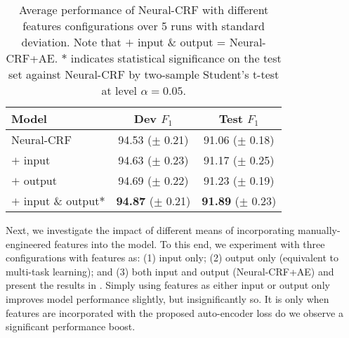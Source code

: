 \begin{table}
\centering
\small
\begin{tabular}{lcc}
\toprule
Model                                            & Dev $F_1$ & Test $F_1$ \\
\midrule
Neural-CRF & 94.53 ($\pm$ 0.21)   & 91.06 ($\pm$ 0.18)    \\
$+$ input                                  & 94.63 ($\pm$ 0.23)   & 91.17 ($\pm$ 0.25)    \\
$+$ output                               & 94.69 ($\pm$ 0.22)   & 91.23 ($\pm$ 0.19)    \\
$+$ input \& output$*$                                    & \textbf{94.87} ($\pm$ 0.21)   & \textbf{91.89} ($\pm$ 0.23)    \\ 
\bottomrule
\end{tabular}
\caption{Average performance of Neural-CRF with different features configurations over 5 runs with standard deviation. Note that $+$ input \& output = Neural-CRF+AE. $*$ indicates statistical significance on the test set against Neural-CRF by two-sample Student's t-test at level $\alpha=0.05$.}
\label{table5}
\end{table}

Next, we investigate the impact of different means of incorporating manually-engineered features into the model. 
To this end, we experiment with three configurations with features as: (1) input only; (2) output only (equivalent to multi-task learning); and (3) both input and output (Neural-CRF+AE) and present the results in .
Simply using features as either input or output only improves model performance slightly, but insignificantly so. 
It is only when features are incorporated with the proposed auto-encoder loss do we observe a significant performance boost.
